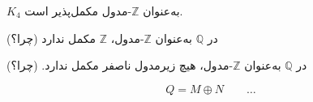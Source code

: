 \begin{frame}
    \begin{example}
        \(K_4\)
        به‌عنوان
        \( \mathbb{Z} \)-مدول مکمل‌پذیر است.

    \end{example}


    \begin{example}
        در \( \mathbb{Q} \) به‌عنوان \( \mathbb{Z} \)-مدول، \( \mathbb{Z} \) مکمل ندارد (چرا؟)

    \end{example}


    \begin{example}
        در \( \mathbb{Q} \) به‌عنوان \( \mathbb{Z} \)-مدول، هیچ زیرمدول ناصفر مکمل ندارد. (چرا؟)

        \[
            Q = M \oplus N
            \qquad \ldots
        \]


    \end{example}

\end{frame}